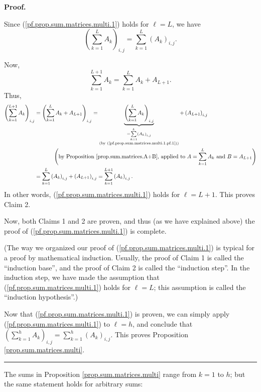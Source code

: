 \documentclass[numbers=enddot,12pt,final,onecolumn,notitlepage]{scrartcl}%
\theoremstyle{definition}
\newenvironment{proof}[1][Proof]{\noindent\textbf{#1.} }{\ \rule{0.5em}{0.5em}}
\let\sumnonlimits\sum
\renewcommand{\sum}{\sumnonlimits\limits}
\begin{document}
\begin{proof}
\begin{enumerate}
Since (\ref{pf.prop.sum.matrices.multi.1}) holds for $\ell=L$, we have%
\begin{equation}
\left(  \sum_{k=1}^{L}A_{k}\right)  _{i,j}=\sum_{k=1}^{L}\left(  A_{k}\right)
_{i,j}. \label{pf.prop.sum.matrices.multi.1.pf.1}%
\end{equation}


Now,%
\[
\sum_{k=1}^{L+1}A_{k}=\sum_{k=1}^{L}A_{k}+A_{L+1}.
\]
Thus,%
\begin{align*}
\left(  \sum_{k=1}^{L+1}A_{k}\right)  _{i,j}  &  =\left(  \sum_{k=1}^{L}%
A_{k}+A_{L+1}\right)  _{i,j}=\underbrace{\left(  \sum_{k=1}^{L}A_{k}\right)
_{i,j}}_{\substack{=\sum_{k=1}^{L}\left(  A_{k}\right)  _{i,j}\\\text{(by
(\ref{pf.prop.sum.matrices.multi.1.pf.1}))}}}+\left(  A_{L+1}\right)  _{i,j}\\
&  \ \ \ \ \ \ \ \ \ \ \left(  \text{by Proposition
\ref{prop.sum.matrices.A+B}, applied to }A=\sum_{k=1}^{L}A_{k}\text{ and
}B=A_{L+1}\right) \\
&  =\sum_{k=1}^{L}\left(  A_{k}\right)  _{i,j}+\left(  A_{L+1}\right)
_{i,j}=\sum_{k=1}^{L+1}\left(  A_{k}\right)  _{i,j}.
\end{align*}
In other words, (\ref{pf.prop.sum.matrices.multi.1}) holds for $\ell=L+1$.
This proves Claim 2.
\end{enumerate}

Now, both Claims 1 and 2 are proven, and thus (as we have explained above) the
proof of (\ref{pf.prop.sum.matrices.multi.1}) is complete.

(The way we organized our proof of (\ref{pf.prop.sum.matrices.multi.1}) is
typical for a proof by mathematical induction. Usually, the proof of Claim 1
is called the \textquotedblleft induction base\textquotedblright, and the
proof of Claim 2 is called the \textquotedblleft induction
step\textquotedblright. In the induction step, we have made the assumption
that (\ref{pf.prop.sum.matrices.multi.1}) holds for $\ell=L$; this assumption
is called the \textquotedblleft induction hypothesis\textquotedblright.)

Now that (\ref{pf.prop.sum.matrices.multi.1}) is proven, we can simply apply
(\ref{pf.prop.sum.matrices.multi.1}) to $\ell=h$, and conclude that $\left(
\sum_{k=1}^{h}A_{k}\right)  _{i,j}=\sum_{k=1}^{h}\left(  A_{k}\right)  _{i,j}%
$. This proves Proposition \ref{prop.sum.matrices.multi}.
\end{proof}

The sums in Proposition \ref{prop.sum.matrices.multi} range from $k=1$ to $h$;
but the same statement holds for arbitrary sums:
\end{document}
